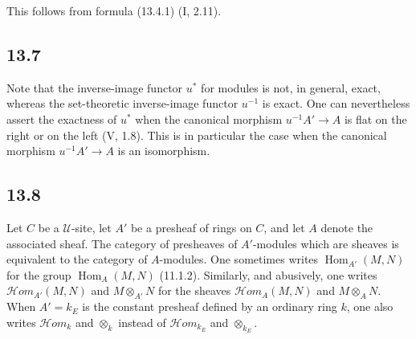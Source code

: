 \documentclass[11pt]{article}
\newcommand{\U}{\mathcal{U}}
\newcommand{\Hom}{\operatorname{Hom}}
\newcommand{\scrHom}{\mathscr{H}\!om}
\begin{document}
This follows from formula (13.4.1) (I, 2.11).

\subsection*{13.7}
Note that the inverse-image functor $u^*$ for modules is not, in general, exact, whereas the set-theoretic inverse-image functor $u^{-1}$ is exact. One can nevertheless assert the exactness of $u^*$ when the canonical morphism $u^{-1}A'\to A$ is flat on the right or on the left (V, 1.8). This is in particular the case when the canonical morphism $u^{-1}A'\to A$ is an isomorphism.

\subsection*{13.8}
Let $C$ be a $\U$-site, let $A'$ be a presheaf of rings on $C$, and let $A$ denote the associated sheaf. The category of presheaves of $A'$-modules which are sheaves is equivalent to the category of $A$-modules. One sometimes writes $\Hom_{A'}(M,N)$ for the group $\Hom_A(M,N)$ (11.1.2). Similarly, and abusively, one writes $\scrHom_{A'}(M,N)$ and $M\otimes_{A'}N$ for the sheaves $\scrHom_A(M,N)$ and $M\otimes_A N$. When $A'=k_E$ is the constant presheaf defined by an ordinary ring $k$, one also writes $\scrHom_k$ and $\otimes_k$ instead of $\scrHom_{k_E}$ and $\otimes_{k_E}$.
\end{document}
